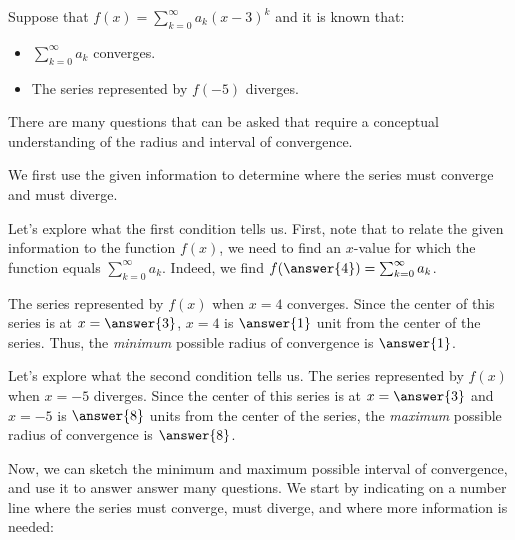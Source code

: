 \documentclass{ximera}
\author{Jim Talamo}
\begin{document}
\begin{exercise}
Suppose that $f(x) = \sum_{k=0}^{\infty} a_k (x-3)^k$ and it is known that:

\begin{itemize}
\item $\sum_{k=0}^{\infty} a_k$ converges.
\item The series represented by $f(-5)$ diverges.
\end{itemize}

There are many questions that can be asked that require a conceptual understanding of the radius and interval of convergence.  

We first use the given information to determine where the series must converge and must diverge.

\begin{exercise}
Let's explore what the first condition tells us.  First, note that to relate the given information to the function $f(x)$, we need to find an $x$-value for which the function equals $\sum_{k=0}^{\infty} a_k$.  Indeed, we find $f(\answer{4}) = \sum_{k=0}^{\infty} a_k$.  

\begin{exercise}
The series represented by $f(x)$ when $x=4$ converges.  Since the center of this series is at $x=\answer{3}$, $x=4$ is $\answer{1}$ unit from the center of the series.  Thus, the \emph{minimum} possible radius of convergence is $\answer{1}$.
\end{exercise}
\end{exercise}


\begin{exercise}
Let's explore what the second condition tells us.  The series represented by $f(x)$ when $x=-5$ diverges.  Since the center of this series is at $x=\answer{3}$ and $x=-5$ is $\answer{8}$ units from the center of the series, the \emph{maximum} possible radius of convergence is $\answer{8}$.
\end{exercise}

\begin{exercise}
Now, we can sketch the minimum and maximum possible interval of convergence, and use it to answer answer many questions.  We start by indicating on a number line where the series must converge, must diverge, and where more information is needed:

\begin{image}
\begin{tikzpicture}


\end{tikzpicture}
\end{image}
\end{exercise}
\end{exercise}
\end{document}
